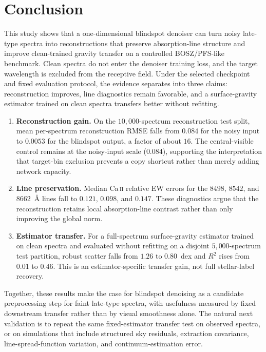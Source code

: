 \documentclass[twocolumn]{aastex7}
\newcounter{protocol}
\begin{document}
\section{Conclusion}
\label{sec:conclusion}
This study shows that a one-dimensional blindspot denoiser can turn noisy late-type spectra into reconstructions that preserve absorption-line structure and improve clean-trained gravity transfer on a controlled BOSZ/PFS-like benchmark. Clean spectra do not enter the denoiser training loss, and the target wavelength is excluded from the receptive field. Under the selected checkpoint and fixed evaluation protocol, the evidence separates into three claims: reconstruction improves, line diagnostics remain favorable, and a surface-gravity estimator trained on clean spectra transfers better without refitting.

\begin{enumerate}
    \item \textbf{Reconstruction gain.} On the $10{,}000$-spectrum reconstruction test split, mean per-spectrum reconstruction RMSE falls from $0.084$ for the noisy input to $0.0053$ for the blindspot output, a factor of about $16$. The central-visible control remains at the noisy-input scale ($0.084$), supporting the interpretation that target-bin exclusion prevents a copy shortcut rather than merely adding network capacity.
    \item \textbf{Line preservation.} Median Ca\,\textsc{ii} relative EW errors for the $8498$, $8542$, and $8662$~\AA{} lines fall to $0.121$, $0.098$, and $0.147$. These diagnostics argue that the reconstruction retains local absorption-line contrast rather than only improving the global norm.
    \item \textbf{Estimator transfer.} For a full-spectrum surface-gravity estimator trained on clean spectra and evaluated without refitting on a disjoint $5{,}000$-spectrum test partition, robust scatter falls from $1.26$ to $0.80$~dex and $R^{2}$ rises from $0.01$ to $0.46$. This is an estimator-specific transfer gain, not full stellar-label recovery.
\end{enumerate}

Together, these results make the case for blindspot denoising as a candidate preprocessing step for faint late-type spectra, with usefulness measured by fixed downstream transfer rather than by visual smoothness alone. The natural next validation is to repeat the same fixed-estimator transfer test on observed spectra, or on simulations that include structured sky residuals, extraction covariance, line-spread-function variation, and continuum-estimation error.
\end{document}
